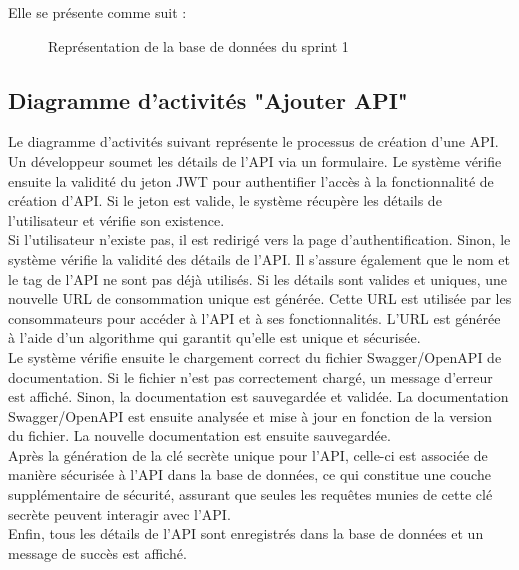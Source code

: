         Elle se présente comme suit :
        
        \begin{figure}[H]
            \centering
            \caption{ Représentation de la base de données du sprint 1 }
            \label{fig:logo_tt}
        \end{figure}

    \subsection{Diagramme d’activités "Ajouter API"}

 
    Le diagramme d’activités suivant représente le processus de création d'une API. Un développeur soumet les détails de l'API via un formulaire. Le système vérifie ensuite la validité du jeton JWT pour authentifier l'accès à la fonctionnalité de création d'API. Si le jeton est valide, le système récupère les détails de l'utilisateur et vérifie son existence. \\
    Si l'utilisateur n'existe pas, il est redirigé vers la page d'authentification. Sinon, le système vérifie la validité des détails de l'API. Il s'assure également que le nom et le tag de l'API ne sont pas déjà utilisés. Si les détails sont valides et uniques, une nouvelle URL de consommation unique est générée. Cette URL est utilisée par les consommateurs pour accéder à l'API et à ses fonctionnalités. L'URL est générée à l'aide d'un algorithme qui garantit qu'elle est unique et sécurisée. \\
    Le système vérifie ensuite le chargement correct du fichier Swagger/OpenAPI de documentation. Si le fichier n'est pas correctement chargé, un message d'erreur est affiché. Sinon, la documentation est sauvegardée et validée. La documentation Swagger/OpenAPI est ensuite analysée et mise à jour en fonction de la version du fichier. La nouvelle documentation est ensuite sauvegardée. \\
    Après la génération de la clé secrète unique pour l'API, celle-ci est associée de manière sécurisée à l'API dans la base de données, ce qui constitue une couche supplémentaire de sécurité, assurant que seules les requêtes munies de cette clé secrète peuvent interagir avec l'API. \\
    Enfin, tous les détails de l'API sont enregistrés dans la base de données et un message de succès est affiché. \\

